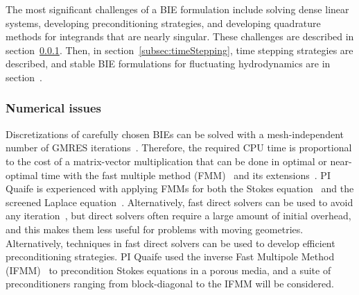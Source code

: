 The most significant challenges of a BIE formulation include solving
dense linear systems, developing preconditioning strategies, and
developing quadrature methods for integrands that are nearly singular.
These challenges are described in section~\ref{subsec:NumericalIssues}.
Then, in section~\ref{subsec:timeStepping}, time stepping strategies are
described, and stable BIE formulations for fluctuating hydrodynamics are
in section~\label{subsec:fluctuating}.


\subsubsection{Numerical issues}
\label{subsec:NumericalIssues}

Discretizations of carefully chosen BIEs can be solved with a
mesh-independent number of GMRES
iterations~\cite{cam-ips-kel-mey-xue1996}. Therefore, the required CPU
time is proportional to the cost of a matrix-vector multiplication that
can be done in optimal or near-optimal time with the fast multiple
method (FMM)~\cite{fmm5} and its extensions~\cite{fmm1, fmm2, fmm3,
fmm4, fmm6, fmm7, fmm8}. PI Quaife is experienced with applying FMMs for
both the Stokes equation~\cite{qua-bir2014, bys-sha-qua2020} and the
screened Laplace equation~\cite{kro-qua2011, qua2011}. Alternatively,
fast direct solvers can be used to avoid any iteration~\cite{fds1, fds2,
fds3, fds4, fds5, fds6, fds7, fds8, ho2016cpam2, ho2016cpam1,
minden2016, minden2017siammms}, but direct solvers often require a large
amount of initial overhead, and this makes them less useful for problems
with moving geometries.  Alternatively, techniques in fast direct
solvers can be used to develop efficient preconditioning strategies. PI
Quaife used the inverse Fast Multipole Method
(IFMM)~\cite{cou-pou-dar2017, qua-cou-dar2018} to precondition Stokes
equations in a porous media, and a suite of preconditioners ranging from
block-diagonal to the IFMM will be considered.  

